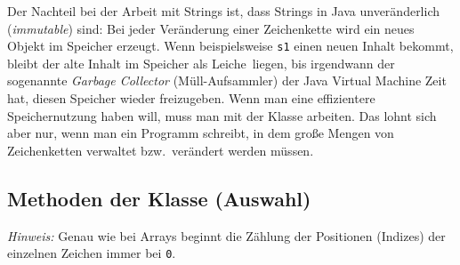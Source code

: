 \begin{framed}
Der Nachteil bei der Arbeit mit Strings ist, dass Strings in Java unveränderlich
(\emph{immutable}) sind: Bei jeder Veränderung einer Zeichenkette wird ein neues
Objekt im Speicher erzeugt. Wenn beispielsweise \lstinline|s1| einen neuen
Inhalt bekommt, bleibt der alte Inhalt im Speicher \glqq als Leiche\grqq\
liegen, bis irgendwann der sogenannte \emph{Garbage Collector}
(\glqq Müll-Aufsammler\grqq ) der Java Virtual Machine Zeit hat, diesen
Speicher wieder freizugeben. Wenn man eine effizientere Speichernutzung haben
will, muss man mit der Klasse \myClass{StringBuilder} arbeiten. Das lohnt sich
aber nur, wenn man ein Programm schreibt, in dem große Mengen von
Zeichenketten verwaltet bzw.\ verändert werden müssen.
\end{framed}

\vfill

\subsection{Methoden der Klasse  (Auswahl)}

\noindent \emph{Hinweis:} Genau wie bei Arrays beginnt die Zählung der Positionen
(Indizes) der einzelnen Zeichen immer bei \texttt{0}.

